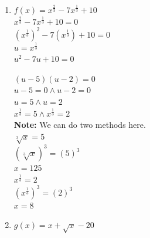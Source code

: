 \begin{example}[Equations]
\begin{enumerate}
\begin{center}
    \end{center}
    $u = 1 \land u = -\frac{1}{3}$ \\
    $(u - 1)(3u + 1) = 0$ \\
    $u - 1 = 0 \land 3u + 1 = 0$ \\
    $x^2 = 1 \land x^2 = -\frac{1}{3}$ \\
    $\sqrt{x^2} = \pm \sqrt{1} \land \sqrt{x^2} = \pm \sqrt{-\frac{1}{3}}$ \\
    $(x = 1 \land = x = i\sqrt{\frac{1}{3}}) \land (x = -1 \land = x = -i\sqrt{\frac{1}{3}})$
  \item $f(x) = x^\frac{2}{3} - 7x^\frac{1}{3} + 10$ \\
    $x^\frac{2}{3} - 7x^\frac{1}{3} + 10 = 0$ \\
    $(x^\frac{1}{3})^2 - 7(x^\frac{1}{3}) + 10 = 0$ \\
    $u = x^\frac{1}{3}$ \\
    $u^2 - 7u + 10 = 0$ \\
    \begin{center}
    \end{center}
    $(u - 5) (u - 2) = 0$ \\
    $u - 5 = 0 \land u - 2 = 0$ \\
    $u = 5 \land u = 2$ \\
    $x^\frac{1}{3} = 5 \land x^\frac{1}{3} = 2$ \\
    \textbf{Note: }We can do two methods here. \\
    $\sqrt[3]{x} = 5$ \\
    $(\sqrt[3]{x})^3 = (5)^3$ \\
    $x = 125$ \\
    $x^\frac{1}{3} = 2$ \\
    $(x^\frac{1}{3})^3 = (2)^3$ \\
    $x = 8$
  \item $g(x) = x + \sqrt{x} - 20$ \\

\end{enumerate}
\end{example}
